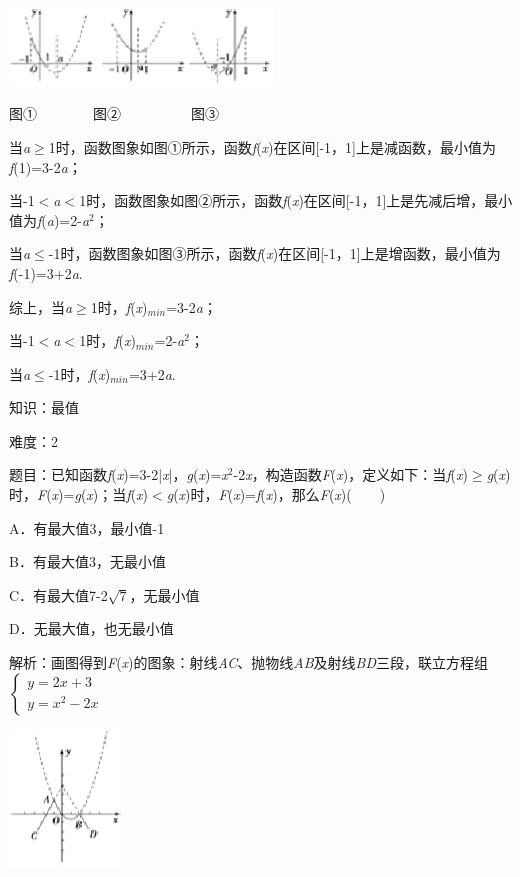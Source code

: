 \documentclass{article} %
\begin{document}
\includegraphics*[width=2.76in, height=0.81in, keepaspectratio=false]{image38}

图①　　　　图②　　　　　图③

当\textit{a}$\mathrm{\ge}$1时，函数图象如图①所示，函数\textit{f}(\textit{x})在区间[-1，1]上是减函数，最小值为\textit{f}(1)=3-2\textit{a}；

当-1$\mathrm{<}$\textit{a}$\mathrm{<}$1时，函数图象如图②所示，函数\textit{f}(\textit{x})在区间[-1，1]上是先减后增，最小值为\textit{f}(\textit{a})=2-\textit{a}${}^{2}$；

当\textit{a}$\mathrm{\le}$-1时，函数图象如图③所示，函数\textit{f}(\textit{x})在区间[-1，1]上是增函数，最小值为\textit{f}(-1)=3+2\textit{a}.

综上，当\textit{a}$\mathrm{\ge}$1时，\textit{f}(\textit{x})${}_{min}$=3-2\textit{a}；

当-1$\mathrm{<}$\textit{a}$\mathrm{<}$1时，\textit{f}(\textit{x})${}_{min}$=2-\textit{a}${}^{2}$；

当\textit{a}$\mathrm{\le}$-1时，\textit{f}(\textit{x})${}_{min}$=3+2\textit{a}.

知识：最值

难度：2

题目：已知函数\textit{f}(\textit{x})=3-2|\textit{x}|，\textit{g}(\textit{x})=\textit{x}${}^{2}$-2\textit{x}，构造函数\textit{F}(\textit{x})，定义如下：当\textit{f}(\textit{x})$\mathrm{\ge}$\textit{g}(\textit{x})时，\textit{F}(\textit{x})=\textit{g}(\textit{x})；当\textit{f}(\textit{x})$\mathrm{<}$\textit{g}(\textit{x})时，\textit{F}(\textit{x})=\textit{f}(\textit{x})，那么\textit{F}(\textit{x})(　　)

A．有最大值3，最小值-1

B．有最大值3，无最小值

C．有最大值7-2$\sqrt{7}$，无最小值

D．无最大值，也无最小值

解析：画图得到\textit{F}(\textit{x})的图象：射线\textit{AC}、抛物线\textit{AB}及射线\textit{BD}三段，联立方程组
$\left\{
\begin{array}{l}
	y=2x+3 \\
	y=x^{2}-2x
\end{array}
\right.$

\includegraphics*[width=1.19in, height=1.45in, keepaspectratio=false]{image39}
\end{document}

